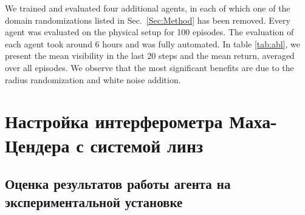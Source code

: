 




We trained and evaluated four additional agents, in each of which one of the domain randomizations listed in Sec.~\ref{Sec:Method} has been removed. Every agent was evaluated on the physical setup for 100 episodes. The evaluation of each agent took around 6 hours and was fully automated. In table \ref{tab:abl}, we present the mean visibility in the last 20 steps and the mean return, averaged over all episodes. We observe that the most significant benefits are due to the radius randomization and white noise addition.


\section{Настройка интерферометра Маха-Цендера с системой линз}

\subsection{Оценка результатов работы агента на экспериментальной установке}



